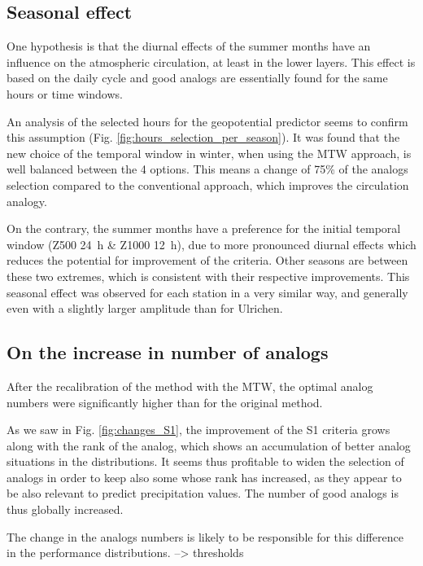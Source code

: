 \documentclass[hess, manuscript]{copernicus}
\begin{document}
\subsection{Seasonal effect}


One hypothesis is that the diurnal effects of the summer months have an influence on the atmospheric circulation, at least in the lower layers. This effect is based on the daily cycle and good analogs are essentially found for the same hours or time windows.

An analysis of the selected hours for the geopotential predictor seems to confirm this assumption (Fig. \ref{fig:hours_selection_per_season}). It was found that the new choice of the temporal window in winter, when using the MTW approach, is well balanced between the 4 options. This means a change of 75\% of the analogs selection compared to the conventional approach, which improves the circulation analogy.

On the contrary, the summer months have a preference for the initial temporal window (Z500 24~h \& Z1000 12~h), due to more pronounced diurnal effects which reduces the potential for improvement of the criteria. Other seasons are between these two extremes, which is consistent with their respective improvements. This seasonal effect was observed for each station in a very similar way, and generally even with a slightly larger amplitude than for Ulrichen.

\subsection{On the increase in number of analogs}

After the recalibration of the method with the MTW, the optimal analog numbers were significantly higher than for the original method. 





As we saw in Fig. \ref{fig:changes_S1}, the improvement of the S1 criteria grows along with the rank of the analog, which shows an accumulation of better analog situations in the distributions. It seems thus profitable to widen the selection of analogs in order to keep also some whose rank has increased, as they appear to be also relevant to predict precipitation values. The number of good analogs is thus globally increased.




The change in the analogs numbers is likely to be responsible for this difference in the performance distributions. --> thresholds
\end{document}
